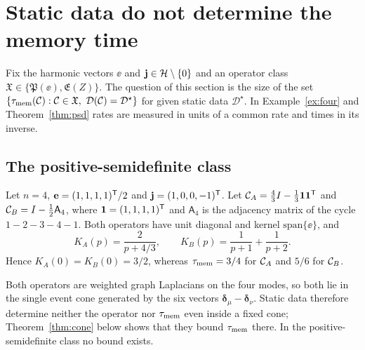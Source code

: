 \section{Static data do not determine the memory time}\label{sec:identifiability}

Fix the harmonic vectors $\ee$ and $\mathbf j\in\mathcal H\setminus\{0\}$ and an operator class
$\mathfrak X\in\{\mathfrak P(\ee),\mathfrak E(Z)\}$. The question of this section is the size of the set
$\{\tau_{\rm mem}(\mathcal C):\mathcal C\in\mathfrak X,\ \mathcal D(\mathcal C)=\mathcal D^\star\}$ for given static data
$\mathcal D^\star$. In Example~\ref{ex:four} and Theorem~\ref{thm:psd} rates are measured in units of a
common rate and times in its inverse.

\subsection{The positive-semidefinite class}\label{sec:psd}

\begin{example}\label{ex:four}
Let $n=4$, $\mathbf e=(1,1,1,1)^{\mathsf T}/2$ and $\mathbf j=(1,0,0,-1)^{\mathsf T}$. Let $\mathcal C_A=\tfrac43I-\tfrac13\mathbf 1\mathbf 1^{\mathsf T}$
and $\mathcal C_B=I-\tfrac12\mathsf A_4$, where $\mathbf 1=(1,1,1,1)^{\mathsf T}$ and $\mathsf A_4$ is the adjacency
matrix of the cycle $1\!-\!2\!-\!3\!-\!4\!-\!1$. Both operators have unit diagonal and kernel
$\mathrm{span}\{\ee\}$, and
\begin{equation}
K_A(p)=\frac{2}{p+4/3},\qquad K_B(p)=\frac1{p+1}+\frac1{p+2}.
\label{eq:four}
\end{equation}
Hence $K_A(0)=K_B(0)=3/2$, whereas $\tau_{\rm mem}=3/4$ for $\mathcal C_A$ and $5/6$ for $\mathcal C_B$.
\end{example}

Both operators are weighted graph Laplacians on the four modes, so both lie in the single event cone
generated by the six vectors $\bm\delta_\mu-\bm\delta_\nu$. Static data therefore determine neither
the operator nor $\tau_{\rm mem}$ even inside a fixed cone; Theorem~\ref{thm:cone} below shows that they bound
$\tau_{\rm mem}$ there. In the positive-semidefinite class no bound exists.

